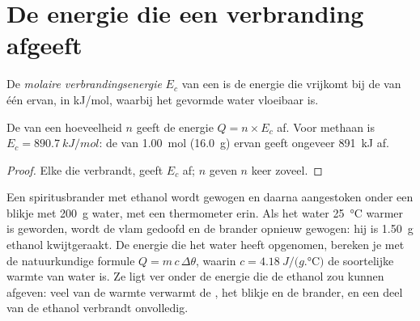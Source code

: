 \section{De energie die een verbranding afgeeft}

\begin{definition}\label{def:g11:reaction-energy:combustion-energy}
De \emph{molaire verbrandingsenergie}
$E_c$ van een  is de energie die vrijkomt bij de  van één  ervan, in \si{kJ/mol}, waarbij het gevormde
water vloeibaar is.
\end{definition}

\begin{proposition}\label{prop:g11:reaction-energy:n-moles}
De  van een hoeveelheid $n$  geeft de
energie $Q = n \times E_c$ af. Voor methaan is $E_c = \qty{890.7}{kJ/mol}$:
de  van \qty{1.00}{mol} (\qty{16.0}{g}) ervan geeft ongeveer
\qty{891}{kJ} af.
\end{proposition}

\begin{proof}
Elke   die verbrandt, geeft $E_c$ af; $n$  geven $n$ keer
zoveel.
\end{proof}

\begin{inthelab}
Een spiritusbrander met ethanol wordt gewogen en daarna aangestoken onder
een  blikje met \qty{200}{g} water, met een thermometer erin. Als
het water \qty{25}{\celsius} warmer is geworden, wordt de vlam gedoofd en
de brander opnieuw gewogen: hij is \qty{1.50}{g} ethanol kwijtgeraakt. De
energie die het water heeft opgenomen, bereken je met de natuurkundige
formule $Q = m\, c\, \Delta\theta$,
waarin $c = \qty{4.18}{J/(g.\celsius)}$ de soortelijke warmte van water
is. Ze ligt ver onder de energie die de ethanol zou kunnen afgeven: veel
van de warmte verwarmt de , het blikje en de brander, en een deel
van de ethanol verbrandt onvolledig.
\end{inthelab}

